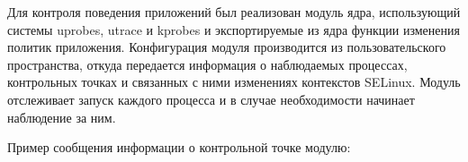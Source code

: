 \begin{comment}
Реализованная система позволяет размечать исполнимый код
наблюдаемых процессов контрольными точками. Для этого необходимо
сообщить в систему информацию об этих точках. Данный процесс описан
в разделе \ref{contpoints}. Система, получив все данные о
разметке приложений контрольными точками и об изменениях
контекстов, связанных с данными контрольными точками,
начинает наблюдение за запуском процессов. В случае запуска
процессов, относительно которых наблюдающая система распоалает
информацией о разметке контрольными точками, система
начинает за ними наблюдение.

\end{comment}

Для контроля поведения приложений был реализован модуль ядра,
использующий системы uprobes, utrace и kprobes и экспортируемые
из ядра функции изменения политик приложения. Конфигурация
модуля производится из пользовательского пространства, откуда
передается информация о наблюдаемых процессах, контрольных точках
и связанных с ними изменениях контекстов SELinux. Модуль
отслеживает запуск каждого процесса и в случае необходимости
начинает наблюдение за ним.

Пример сообщения информации о контрольной точке модулю:



